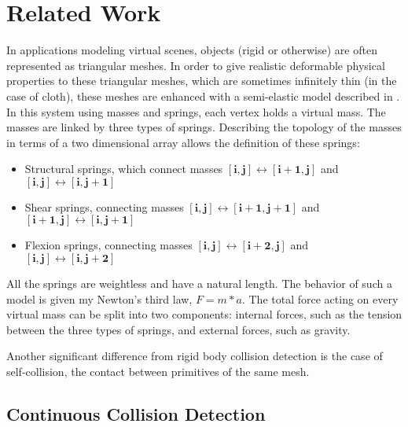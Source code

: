 \chapter{Related Work}
\label{chapter:sota}



In applications modeling virtual scenes, objects (rigid or otherwise) are often represented as triangular meshes. In order to give realistic deformable physical properties to these triangular meshes, which are sometimes infinitely thin (in the case of cloth), these meshes are enhanced with a semi-elastic model described in \citep{provot95}. In this system using masses and springs, each vertex holds a virtual mass. The masses are linked by three types of springs. Describing the topology of the masses in terms of a two dimensional array allows the definition of these springs:

\begin{itemize}
	\item Structural springs, which connect masses $\mathbf{[i, j] \leftrightarrow [i + 1, j]}$ and $\mathbf{[i, j] \leftrightarrow [i,j + 1]}$
	\item Shear springs, connecting masses $\mathbf{[i, j] \leftrightarrow [i + 1, j + 1]}$ and $\mathbf{[i + 1, j] \leftrightarrow [i, j + 1]}$
	\item Flexion springs, connecting masses $\mathbf{[i, j] \leftrightarrow [i + 2, j]}$ and $\mathbf{[i, j] \leftrightarrow [i, j + 2]}$
\end{itemize}
All the springs are weightless and have a natural length. The behavior of such a model is given my Newton's third law, $F = m * a$. The total force acting on every virtual mass can be split into two components: internal forces, such as the tension between the three types of springs, and external forces, such as gravity.

Another significant difference from rigid body collision detection is the case of self-collision, the contact between primitives of the same mesh. 


\FloatBarrier
\section{Continuous Collision Detection}
\label{sec:ccd}

